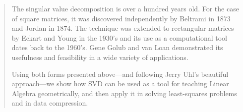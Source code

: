 \documentclass[12pt,a4paper]{article}
\begin{document}
\begin{abstract}
The singular value decomposition is over a hundred years old. For
the case of square matrices, it was discovered independently by
Beltrami in 1873 and Jordan in 1874. The technique was extended to
rectangular matrices by Eckart and Young in the 1930's and its use
as a computational tool dates back to the 1960's.  Gene Golub and
van Loan demonstrated its usefulness and feasibility in a wide
variety of applications.

Using both forms presented above---and following Jerry Uhl's
beautiful approach---we show how SVD can be used as a tool for
teaching Linear Algebra geometrically, and then apply it in
solving least-squares problems and in data compression.

\end{abstract}
\end{document}

